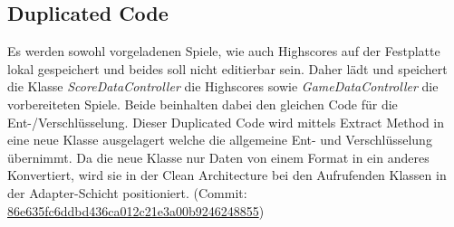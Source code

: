 \newpage
\subsection{Duplicated Code}

Es werden sowohl vorgeladenen Spiele, wie auch Highscores auf der Festplatte lokal gespeichert und beides soll nicht editierbar sein. Daher lädt und speichert die Klasse \textit{ScoreDataController} die Highscores sowie \textit{GameDataController} die vorbereiteten Spiele. Beide beinhalten dabei den gleichen Code für die Ent-/Verschlüsselung. Dieser Duplicated Code wird mittels Extract Method in eine neue Klasse ausgelagert welche die allgemeine Ent- und Verschlüsselung übernimmt. Da die neue Klasse nur Daten von einem Format in ein anderes Konvertiert, wird sie in der Clean Architecture bei den Aufrufenden Klassen in der Adapter-Schicht positioniert. (Commit: \href{https://github.com/EinToni/Wortfinder/commit/86e635fc6ddbd436ca012c21e3a00b9246248855}{86e635fc6ddbd436ca012c21e3a00b9246248855})

\endinput
